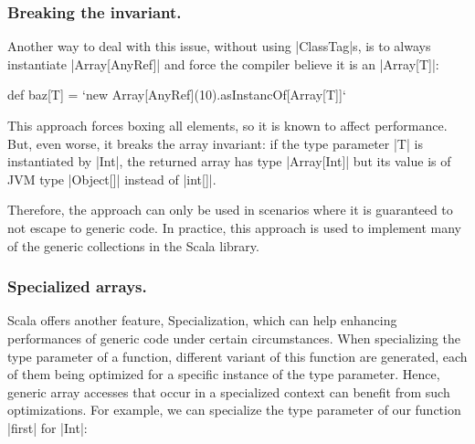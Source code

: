 \subsubsection{Breaking the invariant.} Another way to deal with this issue, without using |ClassTag|s, is to always instantiate |Array[AnyRef]| and force the compiler believe it is an |Array[T]|:

\begin{lstlisting-nobreak}
 def baz[T] = `new Array[AnyRef](10).asInstancOf[Array[T]]`
\end{lstlisting-nobreak}

This approach forces boxing all elements, so it is known to affect performance. But, even worse, it breaks the array invariant: if the type parameter |T| is instantiated by |Int|, the returned array has type |Array[Int]| but its value is of JVM type |Object[]| instead of |int[]|.

Therefore, the approach can only be used in scenarios where it is guaranteed to not escape to generic code. In practice, this approach is used to implement many of the generic collections in the Scala library.

%



\subsubsection{Specialized arrays.}

Scala offers another feature, Specialization, which can help enhancing performances of generic code under certain circumstances. When specializing the type parameter of a function, different variant of this function are generated, each of them being optimized for a specific instance of the type parameter. Hence, generic array accesses that occur in a specialized context can benefit from such optimizations. For example, we can specialize the type parameter of our function |first| for |Int|: 


